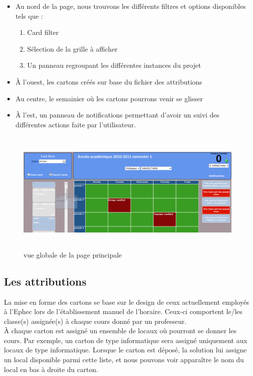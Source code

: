 \begin{itemize}	
	
	\item Au nord de la page, nous trouvons les différents filtres et options disponibles tels que :
	\begin{enumerate}
		\item Card filter
		\item Sélection de la grille à afficher
		\item Un panneau regroupant les différentes instances du projet\\
	\end{enumerate}
	\item À l'ouest, les cartons créés sur base du fichier des attributions\\
	\item Au centre, le semainier où les cartons pourrons venir se glisser\\
	\item À l'est, un panneau de notifications permettant d'avoir un suivi des différentes actions faite par l'utilisateur.
\end{itemize}

\begin{figure}[!h]
	\begin{center}
	\includegraphics[width=16cm,height=6cm]{littlemain.png}	
	\caption{vue globale de la page principale}
\end{center}
\end{figure}

\subsection{Les attributions}
La mise en forme des cartons se base sur le design de ceux actuellement employés à l'Ephec lors de l'établissement manuel de l'horaire. Ceux-ci comportent le/les classe(s) assignée(s) à chaque cours donné par un professeur.\\
\newline
\indent
À chaque carton est assigné un ensemble de locaux où pourront se donner les cours. Par exemple, un carton de type informatique sera assigné uniquement aux locaux de type informatique. Lorsque le carton est déposé, la solution lui assigne un local disponible parmi cette liste, et nous pouvons voir apparaître le nom du local en bas à droite du carton.

